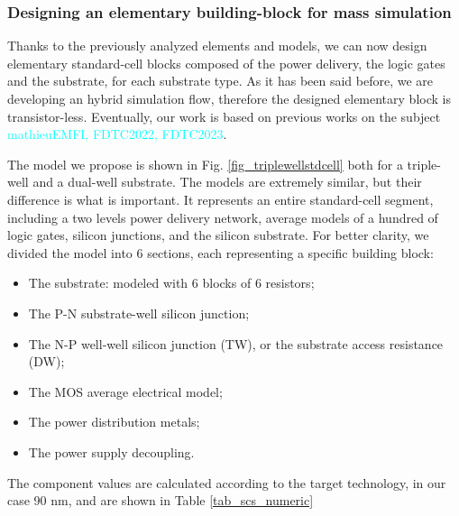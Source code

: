 		\subsubsection{Designing an elementary building-block for mass simulation}
		Thanks to the previously analyzed elements and models, we can now design elementary standard-cell blocks composed of the power delivery, the logic gates and the substrate, for each substrate type.
		As it has been said before, we are developing an hybrid simulation flow, therefore the designed elementary block is transistor-less.
		Eventually, our work is based on previous works on the subject \textcolor{cyan}{mathieuEMFI, FDTC2022, FDTC2023}.
		
		
		
		The model we propose is shown in Fig. \ref{fig_triplewellstdcell} both for a triple-well and a dual-well substrate.
		The models are extremely similar, but their difference is what is important.
		It represents an entire standard-cell segment, including a two levels power delivery network, average models of a hundred of logic gates, silicon junctions, and the silicon substrate.
		For better clarity, we divided the model into 6 sections, each representing a specific building block:
		\begin{itemize}
			\item {} The substrate: modeled with 6 blocks of 6 resistors;
			\item {} The P-N substrate-well silicon junction;
			\item {} The N-P well-well silicon junction (TW), or the substrate access resistance (DW);
			\item {}  The MOS average electrical model;
			\item {}  The power distribution metals;
			\item {} The power supply decoupling.
		\end{itemize}
		The component values are calculated according to the target technology, in our case 90 nm, and are shown in Table \ref{tab_scs_numeric}

